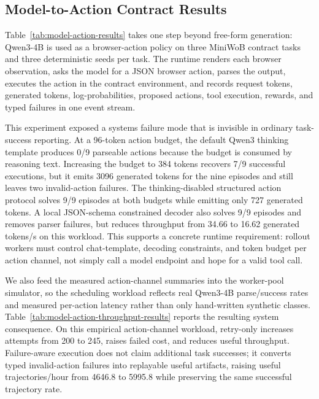 \documentclass{article}
\begin{document}
\subsection{Model-to-Action Contract Results}

Table~\ref{tab:model-action-results} takes one step beyond free-form generation:
Qwen3-4B is used as a browser-action policy on three MiniWoB contract tasks
and three deterministic seeds per task.
The runtime renders each browser observation, asks the model for a JSON browser
action, parses the output, executes the action in the contract environment, and
records request tokens, generated tokens, log-probabilities, proposed actions,
tool execution, rewards, and typed failures in one event stream.

This experiment exposed a systems failure mode that is invisible in ordinary
task-success reporting. At a 96-token action budget, the default Qwen3 thinking
template produces 0/9 parseable actions because the budget is consumed by
reasoning text. Increasing the budget to 384 tokens recovers 7/9 successful
executions, but it emits 3096 generated tokens for the nine episodes and still
leaves two invalid-action failures. The thinking-disabled structured action
protocol solves 9/9 episodes at both budgets while emitting only 727 generated
tokens. A local JSON-schema constrained decoder also solves 9/9 episodes and
removes parser failures, but reduces throughput from 34.66 to 16.62 generated
tokens/s on this workload. This supports a concrete runtime requirement:
rollout workers must control chat-template, decoding constraints, and token
budget per action channel, not simply call a model endpoint and hope for a valid
tool call.

We also feed the measured action-channel summaries into the worker-pool
simulator, so the scheduling workload reflects real Qwen3-4B parse/success
rates and measured per-action latency rather than only hand-written synthetic
classes. Table~\ref{tab:model-action-throughput-results} reports the resulting
system consequence. On this empirical action-channel workload, retry-only
increases attempts from 200 to 245, raises failed cost, and reduces useful
throughput. Failure-aware execution does not claim additional task successes;
it converts typed invalid-action failures into replayable useful artifacts,
raising useful trajectories/hour from 4646.8 to 5995.8 while preserving the
same successful trajectory rate.

\begin{table}[t]
\centering
\scriptsize
\resizebox{\linewidth}{!}{%

}
\caption{Qwen3-4B as a browser-action policy on MiniWoB contract tasks under
two token budgets and two action-channel protocols.}
\label{tab:model-action-results}
\end{table}
\end{document}
